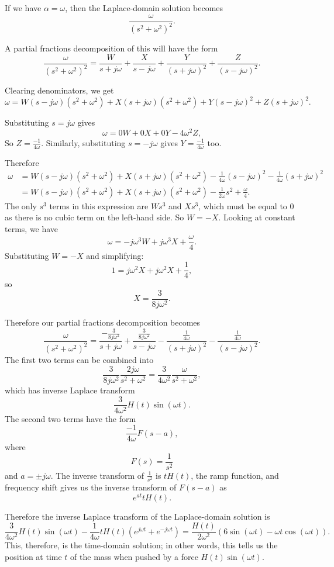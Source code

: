 \documentclass{article}
\begin{document}
If we have $\alpha=\omega$, then the Laplace-domain solution becomes
\[\frac{\omega}{(s^2+\omega^2)^2}.\]




A partial fractions decomposition of this will have the form
\[\frac{\omega}{(s^2+\omega^2)^2}=\frac{W}{s+j\omega}+\frac{X}{s-j\omega}+\frac{Y}{(s+j\omega)^2}+\frac{Z}{(s-j\omega)^2}.\]

Clearing denominators, we get
\[\omega = W(s-j\omega)(s^2+\omega^2)+X(s+j\omega)(s^2+\omega^2)+Y(s-j\omega)^2 + Z(s+j\omega)^2.\]

Substituting $s=j\omega$ gives
\[\omega = 0W+0X+0Y-4\omega^2Z,\]
So $Z=\frac{-1}{4\omega}.$ Similarly, substituting $s=-j\omega$ gives $Y=\frac{-1}{4\omega}$ too.

Therefore
\begin{align*}
	\omega&=W(s-j\omega)(s^2+\omega^2)+X(s+j\omega)(s^2+\omega^2)-\frac{1}{4\omega}(s-j\omega)^2-\frac{1}{4\omega}(s+j\omega)^2\\
	&= W(s-j\omega)(s^2+\omega^2)+X(s+j\omega)(s^2+\omega^2)-\frac{1}{2\omega}s^2 +\frac{\omega}{4}.
\end{align*}
The only $s^3$ terms in this expression are $Ws^3$ and $Xs^3$, which must be equal to 0 as there is no cubic term on the left-hand side. So $W=-X$. Looking at constant terms, we have
\[\omega = -j\omega^3W + j\omega^3X +\frac{\omega}{4}.\]
Substituting $W=-X$ and simplifying:
\[1=j\omega^2X+j\omega^2X+\frac{1}{4},\]
so
\[X=\frac{3}{8j\omega^2}.\]

Therefore our partial fractions decomposition becomes
\[\frac{\omega}{(s^2+\omega^2)^2}=\frac{-\frac{3}{8j\omega^2}}{s+j\omega}+\frac{\frac{3}{8j\omega^2}}{s-j\omega}-\frac{\frac{1}{4\omega}}{(s+j\omega)^2}-\frac{\frac{1}{4\omega}}{(s-j\omega)^2}.\]
The first two terms can be combined into
\[\frac{3}{8j\omega^2}\frac{2j\omega}{s^2+\omega^2}=\frac{3}{4\omega^2}\frac{\omega}{s^2+\omega^2},\]
which has inverse Laplace transform
\[\frac{3}{4\omega^2}H(t)\sin(\omega t).\]
The second two terms have the form
\[\frac{-1}{4\omega}F(s-a),\]
where
\[F(s)=\frac{1}{s^2}\]
and $a=\pm j\omega$. The inverse transform of $\frac{1}{s^2}$ is $tH(t)$, the ramp function, and frequency shift gives us the inverse transform of $F(s-a)$ as
\[e^{at}tH(t).\]

Therefore the inverse Laplace transform of the Laplace-domain solution is
\[\frac{3}{4\omega^2}H(t)\sin(\omega t)-\frac{1}{4\omega}tH(t)\left(e^{j\omega t}+e^{-j\omega t}\right)=\frac{H(t)}{2\omega^2}\left(6\sin(\omega t) - \omega t\cos(\omega t)\right).\]
This, therefore, is the time-domain solution; in other words, this tells us the position at time $t$ of the mass when pushed by a force $H(t)\sin(\omega t)$.
\end{document}
